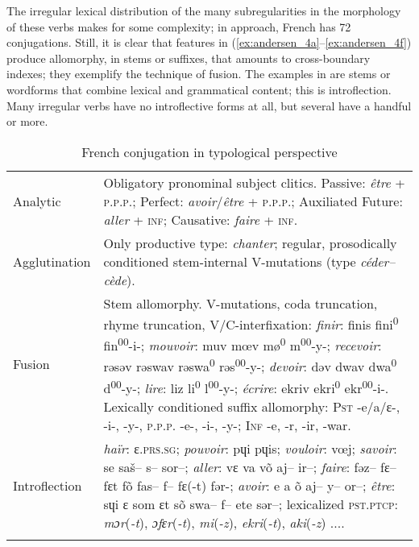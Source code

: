 \documentclass[output=paper, colorlinks,citecolor=brown]{langsci/langscibook}
\begin{document}
The irregular lexical distribution of the many subregularities in the morphology of these verbs makes for some complexity; in  approach, French has 72 conjugations. Still, it is clear that features in (\ref{ex:andersen_4a}--\ref{ex:andersen_4f}) produce allomorphy, in stems or suffixes, that amounts to cross-boundary indexes; they exemplify the technique of fusion. The examples in  are stems or wordforms that combine lexical and grammatical content; this is introflection. Many irregular verbs have no introflective forms at all, but several have a handful or more.

\begin{table}
\caption{French conjugation in typological perspective}
\label{tab:andersen_14}
\begin{tabularx}{\textwidth}{lQ}
\lsptoprule
Analytic & Obligatory pronominal subject clitics. Passive: \textit{être} + \textsc{p.p.p.}; Perfect: \textit{avoir}/\textit{être} + \textsc{p.p.p.}; Auxiliated Future: \textit{aller} + \textsc{inf}; Causative: \textit{faire} + \textsc{inf}.\\
Agglutination & Only productive type: \textit{chanter}; regular, prosodically conditioned stem-internal V-mutations (type \textit{céder–cède}).\\
Fusion & Stem allomorphy. V-mutations, coda truncation, rhyme truncation, V/C-interfixation: \textit{finir}: finis fini\textsuperscript{0} fin\textsuperscript{00}{}-i-; \textit{mouvoir}: muv mœv mø\textsuperscript{0} m\textsuperscript{00}{}-y-; \textit{recevoir}: rǝsǝv rǝswav rǝswa\textsuperscript{0} rǝs\textsuperscript{00}{}-y-; \textit{devoir}: dǝv dwav dwa\textsuperscript{0} d\textsuperscript{00}{}-y-; \textit{lire}: liz li\textsuperscript{0} l\textsuperscript{00}{}-y-; \textit{écrire}: ekriv ekri\textsuperscript{0} ekr\textsuperscript{00}{}-i-. \newline Lexically conditioned suffix allomorphy: \textsc{Pst} -e/a/ɛ-, -i-, -y-, \textsc{p.p.p}. -e-, -i-,
-y-; \textsc{Inf} -e, -r, -ir, -war.\\
Introflection & \textit{haïr}: ɛ.\textsc{prs.sg}; \textit{pouvoir}: pɥi pɥis; \textit{vouloir}: vœj; \textit{savoir}: se saš– s– sor–; \textit{aller}: vɛ va võ aj– ir–; \textit{faire}: fǝz– fɛ– fɛt fõ fas– f– fɛ(-t) fǝr-; \textit{avoir}: e a õ aj– y– or–; \textit{être}: sɥi ɛ som ɛt sõ swa– f– ete sǝr–; lexicalized \textsc{pst.ptcp}: \textit{mɔr}(\textit{{}-t}), \textit{ɔfɛr}(\textit{{}-t}), \textit{mi}(\textit{{}-z}), \textit{ekri}(\textit{{}-t}), \textit{aki}(\textit{{}-z}) ....\\
\lspbottomrule
\end{tabularx}
\end{table}
\end{document}
